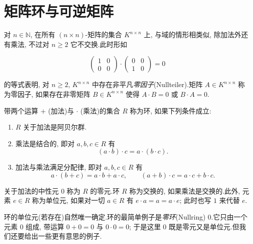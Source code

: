 \section{矩阵环与可逆矩阵}\label{sec:3.3}

对 $n \in \mathbb{N}$, 在所有 $(n \times n)$-矩阵的集合 $K^{n \times n}$ 上, 与域的情形相类似, 除加法外还有乘法, 不过对 $n \geq 2$ 它不交换.此时形如

\[
\begin{pmatrix} 1 & 0 \\ 0 & 0 \end{pmatrix} \cdot \begin{pmatrix} 0 & 0 \\ 1 & 0 \end{pmatrix} = 0
\]

的等式表明, 对 $n \geq 2$, $K^{n \times n}$ 中存在非平凡\emph{零因子}(\textup{Nullteiler}).矩阵 $A \in K^{n \times n}$ 称为零因子, 如果存在非零矩阵 $B \in K^{n \times n}$ 使得 $A \cdot B = 0$ 或 $B \cdot A = 0$.

\begin{definition}\label{def:3.3.1}
带两个运算 $+$ (加法)与 $\cdot$ (乘法)的集合 $R$ 称为环, 如果下列条件成立:
\begin{enumerate}
\item[(i)] $R$ 关于加法是阿贝尔群.
\item[(ii)] 乘法是结合的, 即对 $a, b, c \in R$ 有
\[
(a \cdot b) \cdot c = a \cdot (b \cdot c)\text{.}
\]
\item[(iii)] 加法与乘法满足分配律, 即对 $a, b, c \in R$ 有
\[
a \cdot (b + c) = a \cdot b + a \cdot c, \qquad (a + b) \cdot c = a \cdot c + b \cdot c\text{.}
\]
\end{enumerate}
关于加法的中性元 $0$ 称为 $R$ 的零元.环 $R$ 称为交换的, 如果乘法是交换的.此外, 元素 $e \in R$ 称为单位元, 如果对一切 $a \in R$ 有 $e \cdot a = a = a \cdot e$; 此时也写 $1$ 来代替 $e$.
\end{definition}

环的单位元(若存在)自然唯一确定.环的最简单例子是\emph{零环}(\textup{Nullring}) $0$.它只由一个元素 $0$ 组成, 带运算 $0 + 0 = 0$ 与 $0 \cdot 0 = 0$; 于是这里 $0$ 既是零元又是单位元.但我们还要给出一些更有意思的例子.

